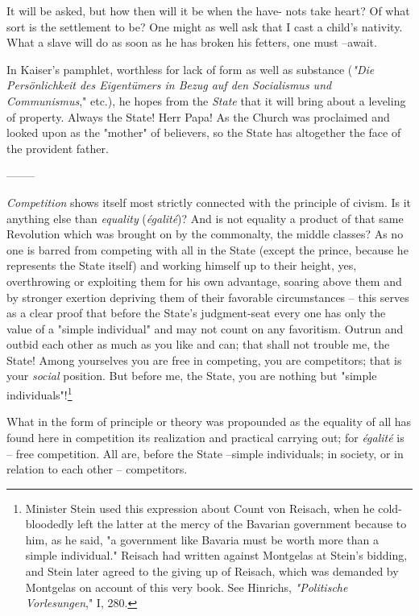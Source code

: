 \documentclass[a4paper]{book}
\begin{document}
It will be asked, but how then will it be when the have- nots take heart? Of 
what sort is the settlement to be? One might as well ask that I cast a child's 
nativity. What a slave will do as soon as he has broken his fetters, one must 
--await.

In Kaiser's pamphlet, worthless for lack of form as well as substance 
(\textit{"{}Die Pers\"onlichkeit des Eigent\"umers in Bezug auf den 
Socialismus und Communismus},"{} etc.), he hopes from the \textit{State} that 
it will bring about a leveling of property. Always the State! Herr Papa! As 
the Church was proclaimed and looked upon as the "{}mother"{} of believers, so 
the State has altogether the face of the provident father.

\begin{center}
--------\end{center}


\textit{Competition} shows itself most strictly connected with the principle 
of civism. Is it anything else than \textit{equality} (\textit{\'egalit\'e})? 
And is not equality a product of that same Revolution which was brought on by 
the commonalty, the middle classes? As no one is barred from competing with 
all in the State (except the prince, because he represents the State itself) 
and working himself up to their height, yes, overthrowing or exploiting them 
for his own advantage, soaring above them and by stronger exertion depriving 
them of their favorable circumstances -- this serves as a clear proof that 
before the State's judgment-seat every one has only the value of a "{}simple 
individual"{} and may not count on any favoritism. Outrun and outbid each 
other as much as you like and can; that shall not trouble me, the State! Among 
yourselves you are free in competing, you are competitors; that is your 
\textit{social} position. But before me, the State, you are nothing but 
"{}simple individuals"{}!\footnote{Minister Stein used this expression about 
Count von Reisach, when he cold-bloodedly left the latter at the mercy of the 
Bavarian government because to him, as he said, "{}a government like Bavaria 
must be worth more than a simple individual."{} Reisach had written against 
Montgelas at Stein's bidding, and Stein later agreed to the giving up of 
Reisach, which was demanded by Montgelas on account of this very book. See 
Hinrichs, \textit{"{}Politische Vorlesungen},"{} I, 280.}

What in the form of principle or theory was propounded as the equality of all 
has found here in competition its realization and practical carrying out; for 
\textit{\'egalit\'e} is -- free competition. All are, before the State 
--simple individuals; in society, or in relation to each other -- competitors.
\end{document}
